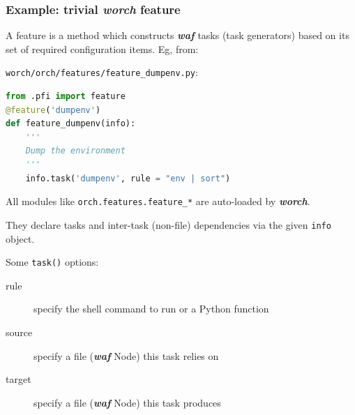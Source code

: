 \documentclass[xcolor=dvipsnames]{beamer}
\newcommand{\app}[1]{\textbf{\textit{#1}}\xspace}
\def\waf{\app{waf}}
\def\worch{\app{worch}}
\begin{document}
\begin{frame}[fragile]
  \frametitle{Example: trivial \worch feature} 

  A feature is a method which constructs \waf tasks (task generators)
  based on its set of required configuration items.  Eg, from:

  \verb|worch/orch/features/feature_dumpenv.py|:
  \begin{lstlisting}[language=Python]
from .pfi import feature
@feature('dumpenv')
def feature_dumpenv(info):
    '''
    Dump the environment
    '''
    info.task('dumpenv', rule = "env | sort")
  \end{lstlisting}

  All modules like \verb|orch.features.feature_*| are auto-loaded by \worch.

  They declare tasks and inter-task (non-file) dependencies via the given \texttt{info} object.

  Some \verb|task()| options:
  \begin{description}
  \item[rule] specify the shell command to run or a Python function
  \item[source] specify a file (\waf Node) this task relies on
  \item[target] specify a file (\waf Node) this task produces
  \end{description}

\end{frame}
\end{document}
